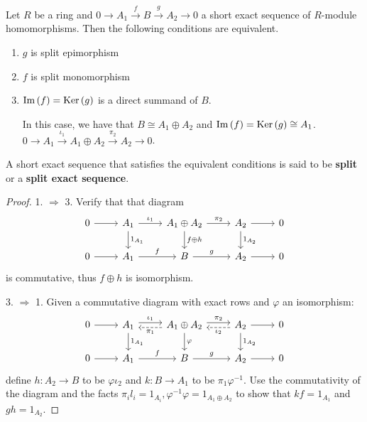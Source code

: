 \documentclass[12pt, oneside]{book}
\begin{document}
\begin{theorem}
    \label{thm: Split exact sequence}
    Let $R$ be a ring and $0 \rightarrow A_1 \xrightarrow{{f}} B \xrightarrow{{g}} A_2 \rightarrow 0$ a short exact sequence of $R$-module homomorphisms. Then the following conditions are equivalent.
    \begin{enumerate}
        \item
              $g$ is split epimorphism

        \item
              $f$ is split monomorphism

        \item
              $\Im\left( f \right)=\operatorname{\operatorname{Ker}}\left( g \right)$ is a direct summand of $B$.


              In this case,
              we have that $B\cong A_1\oplus A_2$ and $\Im\left( f \right)=\operatorname{\operatorname{Ker}}\left( g \right)\cong A_1$.
              $0 \rightarrow A_1 \xrightarrow{\iota_1} A_1 \oplus A_2 \xrightarrow{\pi_2} A_2 \rightarrow 0$.
    \end{enumerate}
    \begin{remark}
        A short exact sequence that satisfies the equivalent conditions is said to be \textbf{split} or a \textbf{split exact sequence}.
    \end{remark}
    \begin{proof}
        1. $\Rightarrow$ 3.
        Verify that that diagram
        \begin{equation*}
            \begin{tikzcd}
                0 \arrow[r] & A_1  \arrow[r,"\iota_1"] \arrow[d,"1_{A_1}"] & A_1\oplus A_2 \arrow[r,"\pi_2"] \arrow[d,"f\oplus h"] & A_2 \arrow[d,"1_{A_2}"] \arrow[r] & 0 \\
                0 \arrow[r] & A_1 \arrow[r,"f"]           & B \arrow[r,"g"]                      & A_2 \arrow[r]           & 0
            \end{tikzcd}
        \end{equation*}
        is commutative, thus $f\oplus h$ is isomorphism.


        3. $\Rightarrow$ 1.
        Given a commutative diagram with exact rows and $\varphi$ an isomorphism:
        \begin{equation*}
            \begin{tikzcd}
                0 \arrow[r] & A_1 \arrow[r,shift left=1,"\iota_1"] \arrow[d,"1_{A_1}"] & A_1\oplus A_2\arrow[l,dashed,shift left=1,"\pi_1"] \arrow[r,shift left=1,"\pi_2" ] \arrow[d,"\varphi"] & \arrow[l,shift left=1,dashed,"\iota_2"]  A_2 \arrow[r] \arrow[d, "1_{A_2}"] & 0 \\
                0 \arrow[r] & A_1 \arrow[r, "f"] & B \arrow[r, "g"]   & A_2 \arrow[r]       & 0
            \end{tikzcd}
        \end{equation*}
        define $h: A_2 \rightarrow B$ to be $\varphi \iota_2$ and $k: B \rightarrow A_1$ to be $\pi_1 \varphi^{-1}$. Use the commutativity of the diagram and the facts $\pi_i l_i=1_{A_i}, \varphi^{-1} \varphi=1_{A_1 \oplus A_2}$ to show that $k f=1_{A_1}$ and $g h=1_{A_2}$.
    \end{proof}
\end{theorem}
\end{document}

